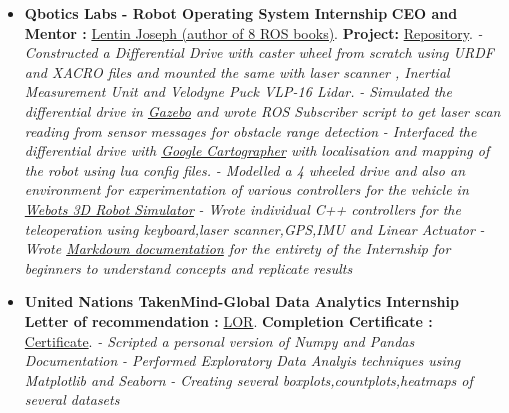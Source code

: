 \documentclass[a4paper,12pt]{article}
\begin{document}
\begin{itemize}
    \item{\textbf{\large{Qbotics Labs - Robot Operating System Internship}}
          \newline
          \textbf{ CEO and Mentor :} \href{https://in.linkedin.com/in/lentinjoseph}{Lentin Joseph (author of 8 ROS books)}.
          \textbf{ Project:} \href{https://github.com/teetangh/Qbotics-Labs-Internship-Differential-Drives}{Repository}.
          \newline
          \textit{- Constructed a Differential Drive with caster wheel from scratch using URDF and XACRO files and mounted the same with laser scanner , Inertial Measurement Unit and Velodyne Puck VLP-16 Lidar. }
          \newline
          \textit{- Simulated the differential drive in \underline{Gazebo} and wrote ROS Subscriber script to get laser scan reading from sensor messages for obstacle range detection }
          \newline
          \textit{- Interfaced the differential drive with \underline{Google Cartographer} with localisation and mapping of the robot using lua config files. }
          \newline
          \textit{- Modelled a 4 wheeled drive and also an environment for experimentation of various controllers for the vehicle in \underline{Webots 3D Robot Simulator}}
          \newline
          \textit{- Wrote individual C++ controllers for the teleoperation using keyboard,laser scanner,GPS,IMU and Linear Actuator}
          \newline
          \textit{- Wrote \underline{Markdown documentation} for the entirety of the Internship for beginners to understand concepts and replicate results}}
\end{itemize}
\begin{itemize}
    \item{\textbf{\large{United Nations TakenMind-Global Data Analytics Internship}}
          \newline
          \textbf{Letter of recommendation :} \href{https://github.com/teetangh/Kaustav-All-Certifications/blob/master/Artificial%20Intelligence/UN%20Takenmind%20Data%20Analytics%20Internship/35799-KaustavGhosh-recommendation-letter.pdf}{LOR}.
          \textbf{Completion Certificate :} \href{https://github.com/teetangh/Kaustav-All-Certifications/blob/master/Artificial%20Intelligence/UN%20Takenmind%20Data%20Analytics%20Internship/35799-KaustavGhosh.pdf}{Certificate}.
              \newline
              \textit{- Scripted a personal version of Numpy and Pandas Documentation }
              \newline
              \textit{- Performed Exploratory Data Analyis techniques using Matplotlib and Seaborn }
              \newline
              \textit{- Creating several boxplots,countplots,heatmaps of several datasets}}
\end{itemize}
\end{document}
